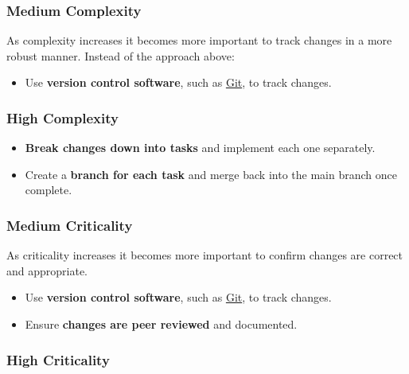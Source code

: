 \documentclass[]{book}
\providecommand{\tightlist}{%
  \setlength{\itemsep}{0pt}\setlength{\parskip}{0pt}}
\begin{document}
\hypertarget{medium-complexity-3}{%
\subsubsection{Medium Complexity}\label{medium-complexity-3}}

As complexity increases it becomes more important to track changes in a more robust manner.
Instead of the approach above:

\begin{itemize}
\tightlist
\item
  Use \textbf{version control software}, such as \href{https://git-scm.com/about}{Git}, to track changes.
\end{itemize}

\hypertarget{high-complexity-3}{%
\subsubsection{High Complexity}\label{high-complexity-3}}

\begin{itemize}
\tightlist
\item
  \textbf{Break changes down into tasks} and implement each one separately.
\item
  Create a \textbf{branch for each task} and merge back into the main branch once complete.
\end{itemize}

\hypertarget{medium-criticality-3}{%
\subsubsection{Medium Criticality}\label{medium-criticality-3}}

As criticality increases it becomes more important to confirm changes are correct and
appropriate.

\begin{itemize}
\tightlist
\item
  Use \textbf{version control software}, such as \href{https://git-scm.com/about}{Git}, to track changes.
\item
  Ensure \textbf{changes are peer reviewed} and documented.
\end{itemize}

\hypertarget{high-criticality-3}{%
\subsubsection{High Criticality}\label{high-criticality-3}}
\end{document}
